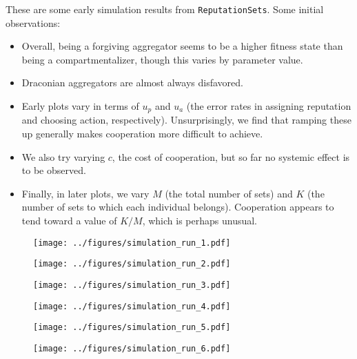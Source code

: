 \documentclass[13pt]{amsart}
\begin{document}
These are some early simulation results from \texttt{ReputationSets}.
Some initial observations:
\begin{itemize}
    \item Overall, being a forgiving aggregator seems to be a higher fitness state than being a compartmentalizer, though this varies by parameter value.
    \item Draconian aggregators are almost always disfavored.
    \item Early plots vary in terms of $u_p$ and $u_a$ (the error rates in assigning reputation and choosing action, respectively).
    Unsurprisingly, we find that ramping these up generally makes cooperation more difficult to achieve.
    \item We also try varying $c$, the cost of cooperation, but so far no systemic effect is to be observed.
    \item Finally, in later plots, we vary $M$ (the total number of sets) and $K$ (the number of sets to which each individual belongs).
    Cooperation appears to tend toward a value of $K/M$, which is perhaps unusual.
\end{itemize}

\begin{itemize}

\end{itemize}

\clearpage

\begin{figure}
    \texttt{[image: ../figures/simulation\_run\_1.pdf]}
\end{figure}

\begin{figure}
    \texttt{[image: ../figures/simulation\_run\_2.pdf]}
\end{figure}

\begin{figure}
    \texttt{[image: ../figures/simulation\_run\_3.pdf]}
\end{figure}

\begin{figure}
    \texttt{[image: ../figures/simulation\_run\_4.pdf]}
\end{figure}

\begin{figure}
    \texttt{[image: ../figures/simulation\_run\_5.pdf]}
\end{figure}

\begin{figure}
    \texttt{[image: ../figures/simulation\_run\_6.pdf]}
\end{figure}
\end{document}
